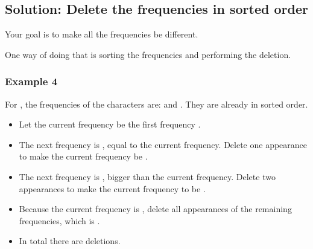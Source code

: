 \documentclass[letterpaper,12pt,english]{book}
\begin{document}
\subsection{Solution: Delete the frequencies in sorted order}
\label{\detokenize{Sorting/04_SORT_1647_Minimum_Deletions_to_Make_Character_Frequencies_Unique:solution-delete-the-frequencies-in-sorted-order}}
\sphinxAtStartPar
Your goal is to make all the frequencies be different.

\sphinxAtStartPar
One way of doing that is sorting the frequencies and performing the deletion.


\subsubsection{Example 4}
\label{\detokenize{Sorting/04_SORT_1647_Minimum_Deletions_to_Make_Character_Frequencies_Unique:example-4}}
\sphinxAtStartPar
For , the frequencies of the characters are:  and . They are already in sorted order.
\begin{itemize}
\item {} 
\sphinxAtStartPar
Let the current frequency be the first frequency .

\item {} 
\sphinxAtStartPar
The next frequency is , equal to the current frequency. Delete one appearance to make the current frequency be .

\item {} 
\sphinxAtStartPar
The next frequency is , bigger than the current frequency. Delete two appearances to make the current frequency to be .

\item {} 
\sphinxAtStartPar
Because the current frequency is , delete all appearances of the remaining frequencies, which is .

\item {} 
\sphinxAtStartPar
In total there are  deletions.

\end{itemize}
\end{document}
